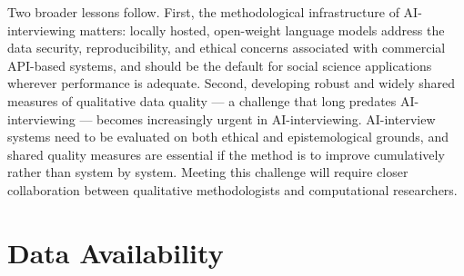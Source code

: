 \documentclass[12pt]{article}
\begin{document}
Two broader lessons follow. First, the methodological infrastructure of AI-interviewing matters: locally hosted, open-weight language models address the data security, reproducibility, and ethical concerns associated with commercial API-based systems, and should be the default for social science applications wherever performance is adequate. Second, developing robust and widely shared measures of qualitative data quality --- a challenge that long predates AI-interviewing --- becomes increasingly urgent in AI-interviewing. AI-interview systems need to be evaluated on both ethical and epistemological grounds, and shared quality measures are essential if the method is to improve cumulatively rather than system by system. Meeting this challenge will require closer collaboration between qualitative methodologists and computational researchers.

\section*{Data Availability}
\end{document}
